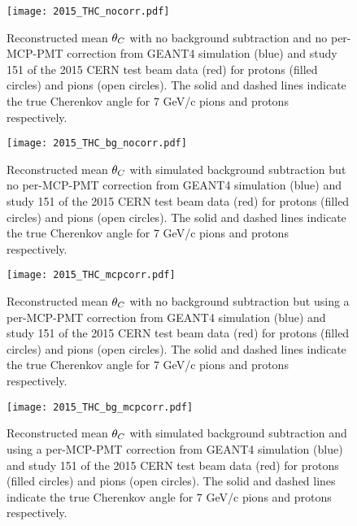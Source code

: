 \begin{figure}[!htb]
	\centering
	\texttt{[image: 2015\_THC\_nocorr.pdf]}
	\caption[Reconstructed mean $\thetaC$ with no background subtraction and no per-MCP-PMT correction from GEANT4 simulation (blue) and study 151 of the 2015 CERN test beam data (red) for protons (filled circles) and pions (open circles).]{Reconstructed mean $\thetaC$ with no background subtraction and no per-MCP-PMT correction from GEANT4 simulation (blue) and study 151 of the 2015 CERN test beam data (red) for protons (filled circles) and pions (open circles). The solid and dashed lines indicate the true Cherenkov angle for 7 GeV/c pions and protons respectively.}
	\label{fig:2015_THC_nocorr}
\end{figure}

\begin{figure}[!htb]
	\centering
	\texttt{[image: 2015\_THC\_bg\_nocorr.pdf]}
	\caption[Reconstructed mean $\thetaC$ with simulated background subtraction but no per-MCP-PMT correction from GEANT4 simulation (blue) and study 151 of the 2015 CERN test beam data (red) for protons (filled circles) and pions (open circles).]{Reconstructed mean $\thetaC$ with simulated background subtraction but no per-MCP-PMT correction from GEANT4 simulation (blue) and study 151 of the 2015 CERN test beam data (red) for protons (filled circles) and pions (open circles). The solid and dashed lines indicate the true Cherenkov angle for 7 GeV/c pions and protons respectively.}
	\label{fig:2015_THC_bg_nocorr}
\end{figure}

\begin{figure}[!htb]
	\centering
	\texttt{[image: 2015\_THC\_mcpcorr.pdf]}
	\caption[Reconstructed mean $\thetaC$ with no background subtraction but using a per-MCP-PMT correction from GEANT4 simulation (blue) and study 151 of the 2015 CERN test beam data (red) for protons (filled circles) and pions (open circles).]{Reconstructed mean $\thetaC$ with no background subtraction but using a per-MCP-PMT correction from GEANT4 simulation (blue) and study 151 of the 2015 CERN test beam data (red) for protons (filled circles) and pions (open circles). The solid and dashed lines indicate the true Cherenkov angle for 7 GeV/c pions and protons respectively.}
	\label{fig:2015_THC_mcpcorr}
\end{figure}

\begin{figure}[!htb]
	\centering
	\texttt{[image: 2015\_THC\_bg\_mcpcorr.pdf]}
	\caption[Reconstructed mean $\thetaC$ with simulated background subtraction and using a per-MCP-PMT correction from GEANT4 simulation (blue) and study 151 of the 2015 CERN test beam data (red) for protons (filled circles) and pions (open circles).]{Reconstructed mean $\thetaC$ with simulated background subtraction and using a per-MCP-PMT correction from GEANT4 simulation (blue) and study 151 of the 2015 CERN test beam data (red) for protons (filled circles) and pions (open circles). The solid and dashed lines indicate the true Cherenkov angle for 7 GeV/c pions and protons respectively.}
	\label{fig:2015_THC_bg_mcpcorr}
\end{figure}

